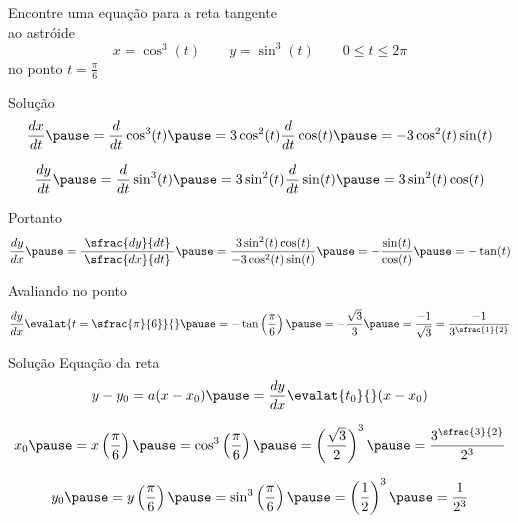\begin{question}
	Encontre uma equação para a reta tangente\\
	ao astróide
	\[
	x = \cos^3(t) \qquad
	y = \sin^3(t) \qquad
	0 \leq t \leq 2\pi
	\]
	no ponto \(t=\frac{\pi}{6}\)
\end{question}

\begin{resolution}{Solução}
	\[
		\frac{dx}{dt}
		\pause
		= \frac{d}{dt}\cos^3(t)
		\pause
		= 3\cos^2(t)\frac{d}{dt}\cos(t)
		\pause
		= -3\cos^2(t)\sin(t)
	\]

	\pause
	\[
		\frac{dy}{dt}
		\pause
		= \frac{d}{dt}\sin^3(t)
		\pause
		= 3\sin^2(t)\frac{d}{dt}\sin(t)
		\pause
		= 3\sin^2(t)\cos(t)
	\]

	\pause
	Portanto
	\[
		\frac{dy}{dx}
		\pause
		= \frac{\;\sfrac{dy}{dt}\;}{\sfrac{dx}{dt}}
		\pause
		= \frac{3\sin^2(t)\cos(t)}{-3\cos^2(t)\sin(t)}
		\pause
		= -\frac{\sin(t)}{\cos(t)}
		\pause
		= -\tan(t)
	\]

	\pause
	Avaliando no ponto
	\[
		\frac{dy}{dx} \evalat{t=\sfrac{\pi}{6}}{}
		\pause
		= -\tan\left(\frac{\pi}{6}\right)
		\pause
		= -\frac{\sqrt{3}}{3}
		\pause
		= \frac{-1}{\sqrt{3}}
		= \frac{-1}{3^{\sfrac{1}{2}}}
	\]
\end{resolution}

\begin{resolution}{Solução}
	Equação da reta
	\[
		y - y_0
		= a (x - x_0)
		\pause
		= \frac{dy}{dx}\evalat{t_0}{} (x - x_0)
	\]

	\pause
	\[
		x_0
		\pause
		= x\left(\frac{\pi}{6}\right)
		\pause
		= \cos^3\left(\frac{\pi}{6}\right)
		\pause
		= \left(\frac{\sqrt{3}}{2}\right)^3
		\pause
		= \frac{3^{\sfrac{3}{2}}}{2^3}
	\]

	\pause
	\[
		y_0
		\pause
		= y\left(\frac{\pi}{6}\right)
		\pause
		= \sin^3\left(\frac{\pi}{6}\right)
		\pause
		= \left(\frac{1}{2}\right)^3
		\pause
		= \frac{1}{2^3}
	\]
\end{resolution}

